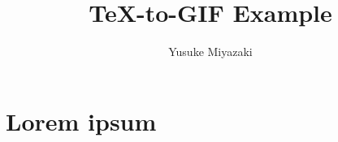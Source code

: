\documentclass[uplatex]{jsarticle}
\title{\TeX-to-GIF Example}
\author{Yusuke Miyazaki}
\begin{document}
\maketitle

\section{Lorem ipsum}
\lipsum[1-3]
\end{document}
